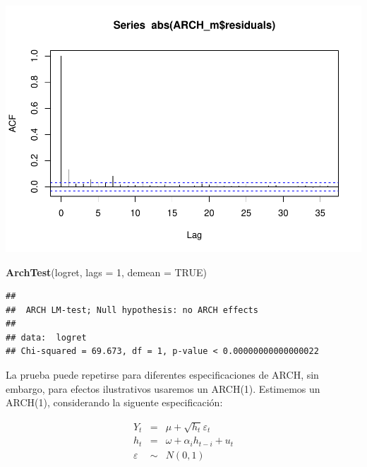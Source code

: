 \documentclass[
]{book}
\newenvironment{Shaded}{\begin{snugshade}}{\end{snugshade}}
\newcommand{\AttributeTok}[1]{\textcolor[rgb]{0.13,0.29,0.53}{#1}}
\newcommand{\ConstantTok}[1]{\textcolor[rgb]{0.56,0.35,0.01}{#1}}
\newcommand{\DecValTok}[1]{\textcolor[rgb]{0.00,0.00,0.81}{#1}}
\newcommand{\FunctionTok}[1]{\textcolor[rgb]{0.13,0.29,0.53}{\textbf{#1}}}
\newcommand{\NormalTok}[1]{#1}
\newcommand{\SpecialCharTok}[1]{\textcolor[rgb]{0.81,0.36,0.00}{\textbf{#1}}}
\begin{document}
\begin{Shaded}
\end{Shaded}

\includegraphics{Notas-Series-Tiempo_files/figure-latex/ArchTest-2.pdf}

\begin{Shaded}
\begin{Highlighting}[]
\FunctionTok{ArchTest}\NormalTok{(logret, }\AttributeTok{lags =} \DecValTok{1}\NormalTok{, }\AttributeTok{demean =} \ConstantTok{TRUE}\NormalTok{)}
\end{Highlighting}
\end{Shaded}

\begin{verbatim}
## 
##  ARCH LM-test; Null hypothesis: no ARCH effects
## 
## data:  logret
## Chi-squared = 69.673, df = 1, p-value < 0.00000000000000022
\end{verbatim}

La prueba puede repetirse para diferentes especificaciones de ARCH, sin embargo, para efectos ilustrativos usaremos un ARCH(1). Estimemos un ARCH(1), considerando la siguente especificación:

\begin{eqnarray*}
    Y_t & = & \mu+\sqrt{h_t}\varepsilon_t \\
    h_t & = & \omega+\alpha_ih_{t-i}+u_t \\
    \varepsilon & \sim & N(0,1)
\end{eqnarray*}
\end{document}
